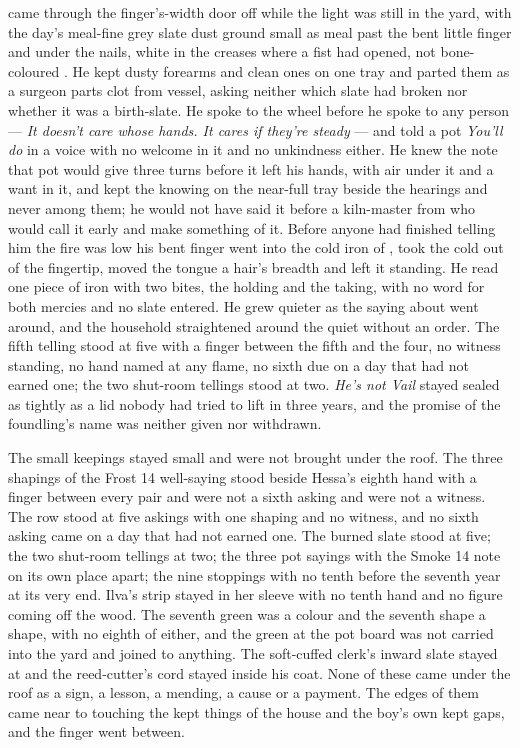  came through the finger's-width door off  while the light was still in the yard, with the day's meal-fine grey slate dust ground small as meal past the bent little finger and under the nails, white in the creases where a fist had opened, not bone-coloured . He kept dusty forearms and clean ones on one tray and parted them as a surgeon parts clot from vessel, asking neither which slate had broken nor whether it was a birth-slate. He spoke to the wheel before he spoke to any person --- \emph{It doesn't care whose hands. It cares if they're steady} --- and told a pot \emph{You'll do} in a voice with no welcome in it and no unkindness either. He knew the note that pot would give three turns before it left his hands, with air under it and a want in it, and kept the knowing on the near-full tray beside the hearings and never among them; he would not have said it before a kiln-master from  who would call it early and make something of it. Before anyone had finished telling him the fire was low his bent finger went into the cold iron of , took the cold out of the fingertip, moved the tongue a hair's breadth and left it standing. He read one piece of iron with two bites, the holding and the taking, with no  word for both mercies and no slate entered. He grew quieter as the saying about  went around, and the household straightened around the quiet without an order. The fifth telling stood at five with a finger between the fifth and the four, no witness standing, no hand named at any flame, no sixth due on a day that had not earned one; the two shut-room tellings stood at two. \emph{He's not Vail} stayed sealed as tightly as a lid nobody had tried to lift in three years, and the promise of the foundling's name was neither given nor withdrawn.

The small keepings stayed small and were not brought under the roof. The three shapings of the Frost 14 well-saying stood beside Hessa's eighth hand with a finger between every pair and were not a sixth asking and were not a witness. The row stood at five askings with one shaping and no witness, and no sixth asking came on a day that had not earned one. The burned slate stood at five; the two shut-room tellings at two; the three pot sayings with the Smoke 14 note on its own place apart; the nine stoppings with no tenth before the seventh year at its very end. Ilva's strip stayed in her sleeve with no tenth hand and no figure coming off the wood. The seventh green was a colour and the seventh shape a shape, with no eighth of either, and the green at the pot board was not carried into the yard and joined to anything. The soft-cuffed clerk's inward slate stayed at  and the reed-cutter's cord stayed inside his coat. None of these came under the roof as a sign, a lesson, a mending, a cause or a payment. The edges of them came near to touching the kept things of the house and the boy's own kept gaps, and the finger went between.

